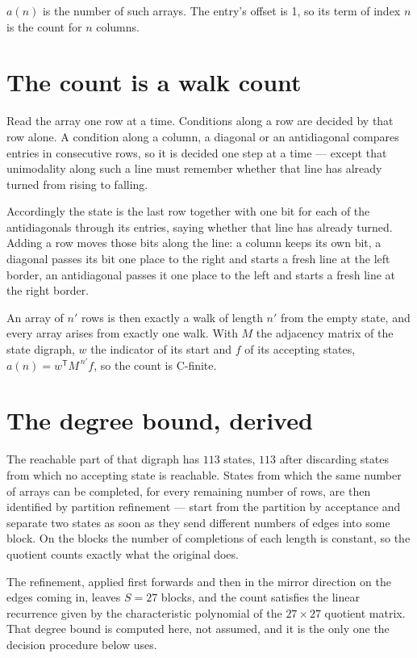 \documentclass[11pt]{article}
\theoremstyle{definition}
\begin{document}
$a(n)$ is the number of such arrays. The entry's offset is 1, so its term of index $n$ is the count for $n$ columns.

\section{The count is a walk count}

Read the array one row at a time. Conditions along a row are decided by that row alone. A condition along a column, a diagonal or an antidiagonal compares entries in consecutive rows, so it is decided one step at a time --- except that unimodality along such a line must remember whether that line has already turned from rising to falling.

Accordingly the state is the last row together with one bit for each of the antidiagonals through its entries, saying whether that line has already turned. Adding a row moves those bits along the line: a column keeps its own bit, a diagonal passes its bit one place to the right and starts a fresh line at the left border, an antidiagonal passes it one place to the left and starts a fresh line at the right border.

An array of $n'$ rows is then exactly a walk of length $n'$ from the empty state, and every array arises from exactly one walk. With $M$ the adjacency matrix of the state digraph, $w$ the indicator of its start and $f$ of its accepting states, $a(n) = w^{\mathsf T}M^{\,n'}f$, so the count is C-finite.

\section{The degree bound, derived}

The reachable part of that digraph has $113$ states, $113$ after discarding states from which no accepting state is reachable. States from which the same number of arrays can be completed, for every remaining number of rows, are then identified by partition refinement --- start from the partition by acceptance and separate two states as soon as they send different numbers of edges into some block. On the blocks the number of completions of each length is constant, so the quotient counts exactly what the original does.

The refinement, applied first forwards and then in the mirror direction on the edges coming in, leaves $S = 27$ blocks, and the count satisfies the linear recurrence given by the characteristic polynomial of the $27 \times 27$ quotient matrix. That degree bound is computed here, not assumed, and it is the only one the decision procedure below uses.
\end{document}
